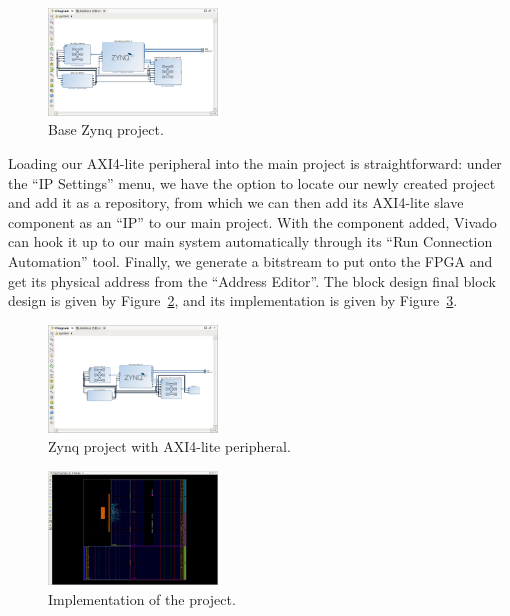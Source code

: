 \documentclass[../paper.tex]{subfiles}
\begin{document}
\begin{figure}[h]
\includegraphics[width=0.4\textwidth]{figures/Zynq}
\centering
\caption{Base Zynq project.}
\label{fig:zynq}
\end{figure}

Loading our AXI4-lite peripheral into the main project is straightforward: under the ``IP Settings'' menu, we have the option to locate our newly created project and add it as a repository, from which we can then add its AXI4-lite slave component as an ``IP'' to our main project. With the component added, Vivado can hook it up to our main system automatically through its ``Run Connection Automation'' tool. Finally, we generate a bitstream to put onto the FPGA and get its physical address from the ``Address Editor''. The block design final block design is given by Figure~\ref{fig:system}, and its implementation is given by Figure~\ref{fig:design}.

\begin{figure}[h]
\includegraphics[width=0.4\textwidth]{figures/ZynqSystem}
\centering
\caption{Zynq project with AXI4-lite peripheral.}
\label{fig:system}
\end{figure}

\begin{figure}[h]
\includegraphics[width=0.4\textwidth]{figures/ZynqDesign}
\centering
\caption{Implementation of the project.}
\label{fig:design}
\end{figure}
\end{document}
